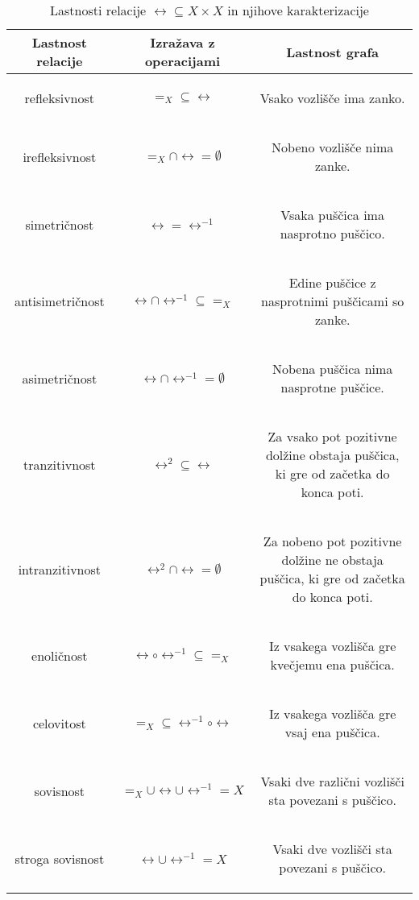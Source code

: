                 \begin{table}[!ht]
                        \centering
                        \newcommand{\opis}[1]{\begin{minipage}{0.45\textwidth}\begin{center}{#1}\end{center}\end{minipage}}
                        \def\arraystretch{3}
                        \begin{tabular}{|ccc|}
                                \hline
                                \textbf{Lastnost relacije} & \textbf{Izražava z operacijami} & \textbf{Lastnost grafa} \\
                                \hline
                                refleksivnost & $=_X \subseteq \rel$ & \opis{Vsako vozlišče ima zanko.} \\
                                irefleksivnost & $=_X \cap \rel = \emptyset$ & \opis{Nobeno vozlišče nima zanke.} \\
                                simetričnost & $\rel = \rel^{-1}$ & \opis{Vsaka puščica ima nasprotno puščico.} \\
                                antisimetričnost & $\rel \cap \rel^{-1} \subseteq =_X$ & \opis{Edine puščice z nasprotnimi puščicami so zanke.} \\
                                asimetričnost & $\rel \cap \rel^{-1} = \emptyset$ & \opis{Nobena puščica nima nasprotne puščice.} \\
                                tranzitivnost & $\rel^2 \subseteq \rel$ & \opis{Za vsako pot pozitivne dolžine obstaja puščica, ki gre od začetka do konca poti.} \\
                                intranzitivnost & $\rel^2 \cap \rel = \emptyset$ & \opis{Za nobeno pot pozitivne dolžine ne obstaja puščica, ki gre od začetka do konca poti.} \\
                                enoličnost & $\rel \circ \rel^{-1} \subseteq =_X$ & \opis{Iz vsakega vozlišča gre kvečjemu ena puščica.} \\
                                celovitost & $=_X \subseteq \rel^{-1} \circ \rel$ & \opis{Iz vsakega vozlišča gre vsaj ena puščica.} \\
                                sovisnost & $=_X \cup \rel \cup \rel^{-1} = X$ & \opis{Vsaki dve različni vozlišči sta povezani s puščico.} \\
                                stroga sovisnost & $\rel \cup \rel^{-1} = X$ & \opis{Vsaki dve vozlišči sta povezani s puščico.} \\
                                \hline
                        \end{tabular}
                        \caption{Lastnosti relacije $\rel \subseteq X \times X$ in njihove karakterizacije}\label{TABELA: Lastnosti relacije}
                \end{table}

